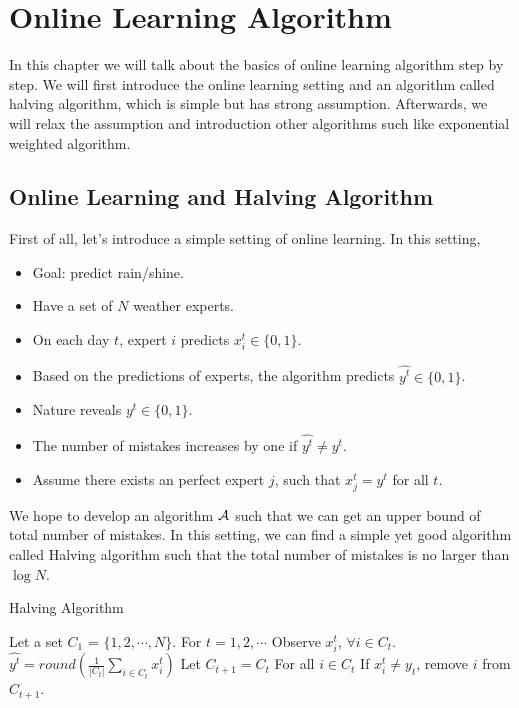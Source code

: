 \documentclass[../main.tex]{subfiles}
\begin{document}
\chapter{Online Learning Algorithm}
In this chapter we will talk about the basics of online learning algorithm step by step. We will first introduce the online learning setting and an algorithm called halving algorithm, which is simple but has strong assumption. Afterwards, we will relax the assumption and introduction other algorithms such like exponential weighted algorithm.

\section{Online Learning and Halving Algorithm}

First of all, let's introduce a simple setting of online learning. In this setting,

\begin{itemize}
	\item Goal: predict rain/shine.
	\item Have a set of $N$ weather experts.
	\item On each day $t$, expert $i$ predicts $x^t_{i} \in \{0, 1\}$.
	\item Based on the predictions of experts, the algorithm predicts $\hat{y^t} \in \{0, 1\}$.
	\item Nature reveals $y^t \in \{0, 1\}$.
	\item The number of mistakes increases by one if $\hat{y^t} \neq y^t$.
	\item Assume there exists an perfect expert $j$, such that $x^t_{j} = y^t$ for all $t$.
\end{itemize}

We hope to develop an algorithm $\mathcal{A}$ such that we can get an upper bound of total number of mistakes. In this setting, we can find a simple yet good algorithm called Halving algorithm such that the total number of mistakes is no larger than $\log N$.

\begin{algorithm}[H]
	\caption{Halving Algorithm}
	\begin{algorithmic}
		\STATE Let a set $C_1$ = $\{1, 2, \cdots, N\}$.
		\STATE For $t = 1, 2, \cdots$
		\bindent
		\STATE Observe $x^t_{i}$, $\forall i \in C_t$.
		\STATE $\hat{y^t} = round(\frac{1}{|C_t|} \sum\limits_{i\in C_t} x^t_{i})$
		\STATE Let $C_{t+1} = C_t$
		\STATE For all $i \in C_t$
		\bindentt
			\STATE If $x^t_{i}\neq y_{t}$, remove $i$ from $C_{t+1}$.
		\eindentt
		\eindent
	\end{algorithmic}
\end{algorithm}
\end{document}
